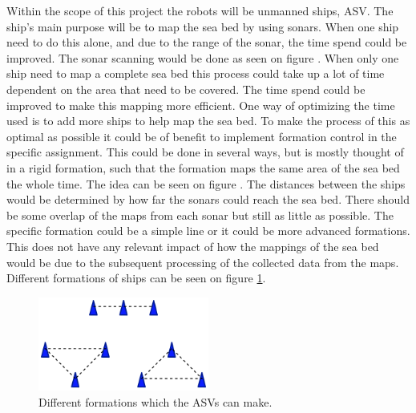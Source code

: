 Within the scope of this project the robots will be unmanned ships, \ac{ASV}. The ship's main purpose will be to map the sea bed by using sonars. When one ship need to do this alone, and due to the range of the sonar, the time spend could be improved. The sonar scanning would be done as seen on figure . When only one ship need to map a complete sea bed this process could take up a lot of time dependent on the area that need to be covered. The time spend could be improved to make this mapping more efficient. One way of optimizing the time used is to add more ships to help map the sea bed. To make the process of this as optimal as possible it could be of benefit to implement formation control in the specific assignment. This could be done in several ways, but is mostly thought of in a rigid formation, such that the formation maps the same area of the sea bed the whole time. The idea can be seen on figure . The distances between the ships would be determined by how far the sonars could reach the sea bed. There should be some overlap of the maps from each sonar but still as little as possible. The specific formation could be a simple line or it could be more advanced formations. This does not have any relevant impact of how the mappings of the sea bed would be due to the subsequent processing of the collected data from the maps. Different formations of ships can be seen on figure \ref{fig:diffforms}.
\begin{figure}[ht]
	\includegraphics[width=0.5\textwidth]{fig/diffforms}
	\caption{Different formations which the \ac{ASV}s can make.}
	\label{fig:diffforms}
\end{figure}
